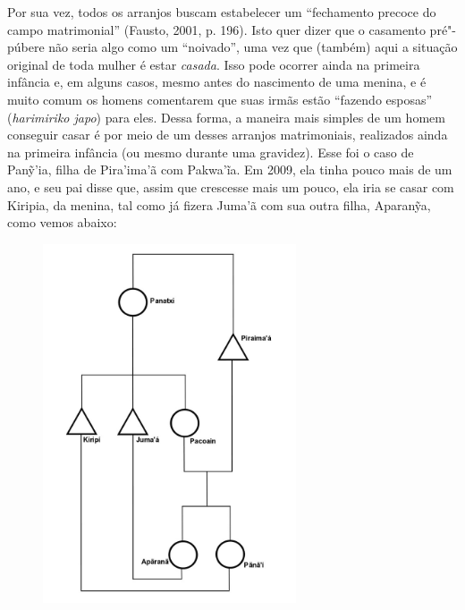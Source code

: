 Por sua vez, todos os arranjos buscam estabelecer um ``fechamento precoce
do campo matrimonial'' (Fausto, 2001, p. 196). Isto quer dizer que o
casamento pré"-púbere não seria algo como um ``noivado'', uma vez que
(também) aqui a situação original de toda mulher é estar \emph{casada}.
Isso pode ocorrer ainda na primeira infância e, em alguns casos, mesmo
antes do nascimento de uma menina, e é muito comum os homens comentarem
que suas irmãs estão ``fazendo esposas'' (\emph{harimiriko japo}) para
eles. Dessa forma, a maneira mais simples de um homem conseguir casar é
por meio de um desses arranjos matrimoniais, realizados ainda na
primeira infância (ou mesmo durante uma gravidez). Esse foi o caso de
Panỹ'ia, filha de Pira'ima'ã com Pakwa'ĩa. Em 2009, ela tinha pouco mais
de um ano, e seu pai disse que, assim que crescesse mais um pouco, ela
iria se casar com Kiripia,  da menina, tal como já fizera Juma'ã com
sua outra filha, Aparanỹa, como vemos abaixo:

\begin{figure}[H]
\centering
  \includegraphics[width=75mm]{./imgs/Figura_9}
\end{figure}

